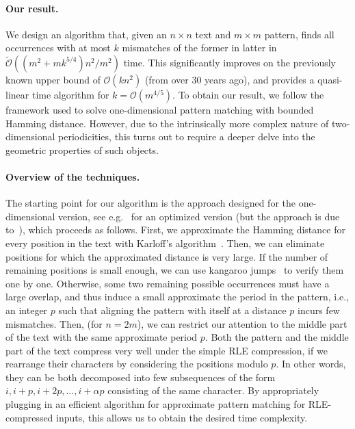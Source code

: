 \documentclass[11pt, letterpaper]{article}
\theoremstyle{plain}
\theoremstyle{definition}
\theoremstyle{remark}
\renewcommand{\O}{\mathcal{O}}
\newcommand{\tO}{\tilde{\mathcal{O}}}
\begin{document}
\paragraph{Our result.} We design an algorithm that, given an $n\times n$ text and $m\times m$ pattern, finds
all occurrences with at most $k$ mismatches of the former in latter in $\tO((m^2 + mk^{5/4})n^2 / m^2)$ time.
This significantly improves on the previously known upper bound of $\O(kn^{2})$ (from over 30 years ago),
and provides a quasi-linear time algorithm for $k=\O(m^{4/5})$. To obtain our result, we follow the framework
used to solve one-dimensional pattern matching with bounded Hamming distance. However, due to the intrinsically
more complex nature of two-dimensional periodicities, this turns out to require a deeper delve into the geometric
properties of such objects.

\paragraph{Overview of the techniques.}
The starting point for our algorithm is the approach designed for the one-dimensional version, see e.g.~\cite{Gawrychowski2018}
for an optimized version (but the approach is due to~\cite{Clifford2015}), which proceeds as follows.
First, we approximate the Hamming distance for every position in the text with Karloff's algorithm~\cite{Karloff1993}.
Then, we can eliminate positions for which the approximated distance is very large.
If the number of remaining positions is small enough, we can use kangaroo jumps~\cite{Galil1986} to verify them one by one.
Otherwise, some two remaining possible occurrences must have a large overlap, and thus induce a small approximate
the period in the pattern, i.e., an integer $p$ such that aligning the pattern with itself at a distance $p$ incurs few mismatches.
Then, (for $n=2m$), we can restrict our attention to the middle part of the text with the same approximate period $p$.
Both the pattern and the middle part of the text compress very well under the simple RLE compression, if we rearrange their characters
by considering the positions modulo $p$. In other words, they can be both decomposed into few subsequences
of the form $i, i+p, i+2p, \ldots, i+\alpha p$ consisting of the same character.
By appropriately plugging in an efficient algorithm for approximate pattern
matching for RLE-compressed inputs, this allows us to obtain the desired time complexity.
\end{document}
